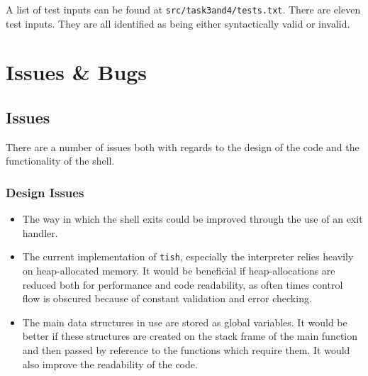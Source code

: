 \documentclass[12pt]{article}
\begin{document}
\newpage



A list of test inputs can be found at
\texttt{src/task3and4/tests.txt}. There are eleven test inputs.
They are all identified as being either syntactically valid or
invalid.

\section{Issues \& Bugs}

\subsection{Issues}

There are a number of issues both with regards to the design of
the code and the functionality of the shell.

\subsubsection{Design Issues}

\begin{itemize}
\item
  The way in which the shell exits could be improved through the
  use of an exit handler.
\item
  The current implementation of \texttt{tish}, especially the
  interpreter relies heavily on heap-allocated memory. It would
  be beneficial if heap-allocations are reduced both for
  performance and code readability, as often times
  control flow is obscured because of constant validation and
  error checking.
\item
  The main data structures in use are stored as global
  variables. It would be better if these structures are created
  on the stack frame of the main function and then passed by
  reference to the functions which require them. It would also
  improve the readability of the code.
\end{itemize}
\end{document}

